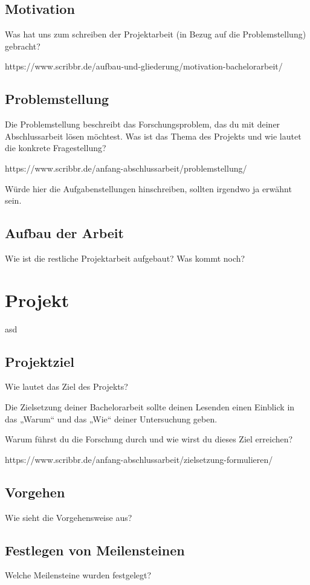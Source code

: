 \documentclass[fontsize=12pt,paper=a4,open=any,parskip=half,
  twoside=false,toc=listof,toc=bibliography,fleqn,leqno,
  captions=nooneline,captions=tableabove,british]{scrbook}
\begin{document}
\section{Motivation}
Was hat uns zum schreiben der Projektarbeit (in Bezug auf die Problemstellung) gebracht?

https://www.scribbr.de/aufbau-und-gliederung/motivation-bachelorarbeit/
\section{Problemstellung}
Die Problemstellung beschreibt das Forschungsproblem, das du mit deiner Abschlussarbeit lösen möchtest.
Was ist das Thema des Projekts und wie lautet die konkrete Fragestellung?

https://www.scribbr.de/anfang-abschlussarbeit/problemstellung/

Würde hier die Aufgabenstellungen hinschreiben, sollten irgendwo ja erwähnt sein.

\section{Aufbau der Arbeit}
Wie ist die restliche Projektarbeit aufgebaut? Was kommt noch?


\chapter{Projekt}
asd
\section{Projektziel}
Wie lautet das Ziel des Projekts?


Die Zielsetzung deiner Bachelorarbeit sollte deinen Lesenden einen Einblick in das „Warum“ und das „Wie“ deiner Untersuchung geben.

Warum führst du die Forschung durch und wie wirst du dieses Ziel erreichen?

https://www.scribbr.de/anfang-abschlussarbeit/zielsetzung-formulieren/

\section{Vorgehen}
Wie sieht die Vorgehensweise aus?
\section{Festlegen von Meilensteinen}
Welche Meilensteine wurden festgelegt?
\end{document}
